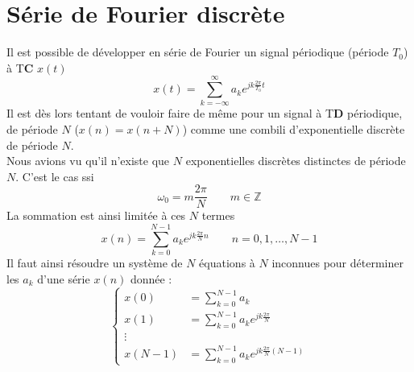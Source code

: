 \section{Série de Fourier discrète}
Il est possible de développer en série de Fourier un signal périodique (période $T_0$) 
à T\textbf{C} $x(t)$ 
\begin{equation}
x(t) = \sum_{k=-\infty}^\infty a_k e^{jk\frac{2\pi}{T_0}t}
\end{equation}
Il est dès lors tentant de vouloir faire de même pour un signal à T\textbf{D} périodique, 
de période $N$ ($x(n)=x(n+N)$) comme une combili d'exponentielle discrète de période $N$.\\
Nous avions vu qu'il n'existe que $N$ exponentielles discrètes distinctes de période $N$. 
C'est le cas ssi
\begin{equation}
\omega_0 = m\dfrac{2\pi}{N}\qquad m\in\mathbb{Z}
\end{equation}
La sommation est ainsi limitée à ces $N$ termes
\begin{equation}
x(n) = \sum_{k=0}^{N-1} a_ke^{jk\frac{2\pi}{N}n}\qquad n=0,1,\dots,N-1
\label{eq:syst}
\end{equation}
Il faut ainsi résoudre un système de $N$ équations à $N$ inconnues pour déterminer les $a_k$ 
d'une série $x(n)$ donnée :
\begin{equation}
\left\{\begin{array}{ll}
x(0) &= \sum_{k=0}^{N-1} a_k\\
x(1) &= \sum_{k=0}^{N-1} a_ke^{jk\frac{2\pi}{N}}\\
\vdots\\
x(N-1) &= \sum_{k=0}^{N-1} a_ke^{jk\frac{2\pi}{N}(N-1)}
\end{array}\right.
\end{equation}


